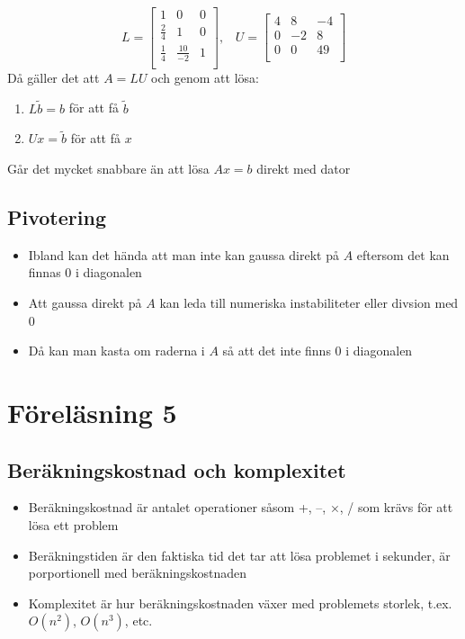 \documentclass[a4paper,11pt]{article}
\begin{document}
\[L = 
\left[
\begin{array}{ccc}
    1 & 0 & 0 \\
    \frac{2}{4} & 1 & 0 \\
    \frac{1}{4} & \frac{10}{-2} & 1 \\
\end{array}
\right]
, \hspace{10pt}
U = \left[
\begin{array}{ccc}
    4 & 8 & -4 \\
    0 & -2 & 8 \\
    0 & 0 & 49 \\
\end{array}
\right]
\]
Då gäller det att $A = LU$ och genom att lösa:
\begin{enumerate}
    \item $L\tilde{b} = b$ för att få $\tilde{b}$
    \item $Ux = \tilde{b}$ för att få $x$
\end{enumerate}
Går det mycket snabbare än att lösa $Ax = b$ direkt med dator

\subsection{Pivotering} %
\begin{itemize}
    \item Ibland kan det hända att man inte kan gaussa direkt på $A$ eftersom det kan finnas 0 i diagonalen
    \item Att gaussa direkt på $A$ kan leda till numeriska instabiliteter eller divsion med 0
    \item Då kan man kasta om raderna i $A$ så att det inte finns 0 i diagonalen
\end{itemize}

\section{Föreläsning 5}
\subsection{Beräkningskostnad och komplexitet}
\begin{itemize}
    \item Beräkningskostnad är antalet operationer såsom +, --, $\times$, / som krävs för att lösa ett problem
    \item Beräkningstiden är den faktiska tid det tar att lösa problemet i sekunder, är porportionell med beräkningskostnaden
    \item Komplexitet är hur beräkningskostnaden växer med problemets storlek, t.ex. ${O}(n^2)$, $O(n^3)$, etc.
\end{itemize}
\end{document}
